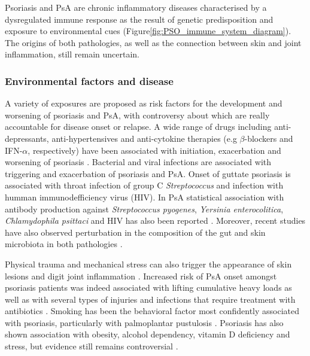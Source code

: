 Psoriasis and PsA are chronic inflammatory diseases characterised by a dysregulated immune response as the result of genetic predisposition and exposure to environmental cues (Figure\ref{fig:PSO_immune_system_diagram}). The origins of both pathologies, as well as the connection between skin and joint inflammation, still remain uncertain.


\subsubsection*{Environmental factors and disease}

A variety of exposures are proposed as risk factors for the development and worsening of psoriasis and PsA, with controversy about which are really accountable for disease onset or relapse. A wide range of drugs including anti-depressants, anti-hypertensives and anti-cytokine therapies (e.g $\beta$-blockers and IFN-$\alpha$, respectively) have been associated with initiation, exacerbation and worsening of psoriasis \parencite{Kim2010}. Bacterial and viral infections are associated with triggering and exacerbation of psoriasis and PsA. Onset of guttate psoriasis is associated with throat infection of group C \textit{Streptococcus} and infection with humman immunodefficiency virus (HIV). In PsA statistical association with antibody production against \textit{Streptococcus pyogenes}, \textit{Yersinia enterocolitica}, \textit{ Chlamydophila psittaci} and HIV has also been reported \parencite{Gudjonsson2003,Valdimarsson2009,Diluvio2006,Thrastardottir2018}. Moreover, recent studies have also observed perturbation in the composition of the gut and skin microbiota in both pathologies \parencite{Eppinga2014, Yan2017}.

Physical trauma and mechanical stress can also trigger the appearance of skin lesions and digit joint inflammation \parencite {Weiss2002,Nestle2009}. Increased risk of PsA onset amongst psoriasis patients was indeed associated with lifting cumulative heavy loads as well as with several types of injuries and infections that require treatment with antibiotics \parencite{Eder2011}. Smoking has been the behavioral factor most confidently associated with psoriasis, particularly with palmoplantar pustulosis \parencite{Armstrong2014}. Psoriasis has also shown association with obesity, alcohol dependency, vitamin D deficiency and stress, but evidence still remains controversial \parencite{Meglio2014}. 

